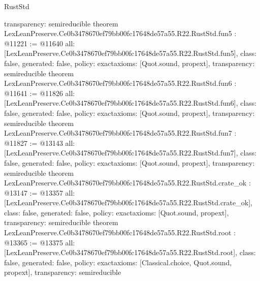 \begin{lexlean}{RustStd}
\begin{coremodule}
{  transparency: semireducible
}
theorem LexLeanPreserve.Ce0b3478670ef79bb00fc17648de57a55.R22.RustStd.fun5 : @11221 := @11640 {
  all: [LexLeanPreserve.Ce0b3478670ef79bb00fc17648de57a55.R22.RustStd.fun5],
  class: false,
  generated: false,
  policy: exact{axioms: [Quot.sound, propext]},
  transparency: semireducible
}
theorem LexLeanPreserve.Ce0b3478670ef79bb00fc17648de57a55.R22.RustStd.fun6 : @11641 := @11826 {
  all: [LexLeanPreserve.Ce0b3478670ef79bb00fc17648de57a55.R22.RustStd.fun6],
  class: false,
  generated: false,
  policy: exact{axioms: [Quot.sound, propext]},
  transparency: semireducible
}
theorem LexLeanPreserve.Ce0b3478670ef79bb00fc17648de57a55.R22.RustStd.fun7 : @11827 := @13143 {
  all: [LexLeanPreserve.Ce0b3478670ef79bb00fc17648de57a55.R22.RustStd.fun7],
  class: false,
  generated: false,
  policy: exact{axioms: [Quot.sound, propext]},
  transparency: semireducible
}
theorem LexLeanPreserve.Ce0b3478670ef79bb00fc17648de57a55.R22.RustStd.crate_ok : @13147 := @13357 {
  all: [LexLeanPreserve.Ce0b3478670ef79bb00fc17648de57a55.R22.RustStd.crate_ok],
  class: false,
  generated: false,
  policy: exact{axioms: [Quot.sound, propext]},
  transparency: semireducible
}
theorem LexLeanPreserve.Ce0b3478670ef79bb00fc17648de57a55.R22.RustStd.root : @13365 := @13375 {
  all: [LexLeanPreserve.Ce0b3478670ef79bb00fc17648de57a55.R22.RustStd.root],
  class: false,
  generated: false,
  policy: exact{axioms: [Classical.choice, Quot.sound, propext]},
  transparency: semireducible
}


\end{coremodule}
\end{lexlean}

